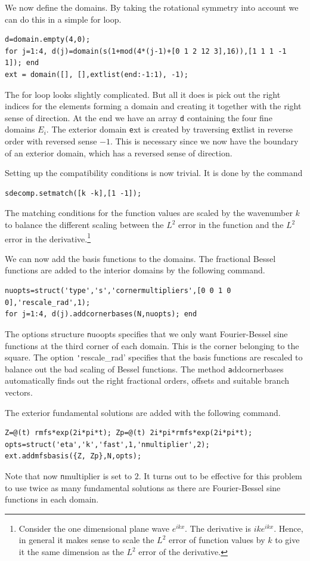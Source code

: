 We now define the domains. By taking the rotational symmetry into
account we can do this in a simple for loop.

\begin{verbatim}
d=domain.empty(4,0);
for j=1:4, d(j)=domain(s(1+mod(4*(j-1)+[0 1 2 12 3],16)),[1 1 1 -1 1]); end
ext = domain([], [],extlist(end:-1:1), -1); 
\end{verbatim}
The for loop looks slightly complicated. But all it does is pick out
the right indices for the elements forming a domain and creating it
together with the right sense of direction. At the end we have an
array {\texttt d} containing the four fine domains $E_i$. The exterior
domain {\texttt ext} is created by traversing {\texttt extlist} in
reverse order with reversed sense $-1$. This is necessary since we now
have the boundary of an exterior domain, which has a reversed sense of
direction.

Setting up the compatibility conditions is now trivial. It is done by
the command
\begin{verbatim}
sdecomp.setmatch([k -k],[1 -1]);
\end{verbatim}
The matching conditions for the function values are scaled by the
wavenumber $k$ to balance the different scaling between the $L^2$ error
in the function and the $L^2$ error in the
derivative.\footnote{Consider the one dimensional plane wave
  $e^{ikx}$. The derivative is $ike^{ikx}$. Hence, in general it makes sense to
  scale the $L^2$ error of function values by $k$ to give it the same
  dimension as the $L^2$ error of the derivative.}

We can now add the basis functions to the domains. The fractional
Bessel functions are added to the interior domains by the following
command.
\begin{verbatim}
nuopts=struct('type','s','cornermultipliers',[0 0 1 0 0],'rescale_rad',1);
for j=1:4, d(j).addcornerbases(N,nuopts); end
\end{verbatim}
The options structure {\texttt nuoopts} specifies that we only want
Fourier-Bessel sine functions at the third corner of each domain. This
is the corner belonging to the square. The option {\texttt
  'rescale\_rad'} specifies that the basis functions are rescaled to
balance out the bad scaling of Bessel functions. The method {\texttt
  addcornerbases} automatically finds out the right fractional orders,
offsets and suitable branch vectors.

The exterior fundamental solutions are added with the following command.
\begin{verbatim}
Z=@(t) rmfs*exp(2i*pi*t); Zp=@(t) 2i*pi*rmfs*exp(2i*pi*t);
opts=struct('eta','k','fast',1,'nmultiplier',2);
ext.addmfsbasis({Z, Zp},N,opts);
\end{verbatim}
Note that now {\texttt nmultiplier} is set to $2$. It turns out to be
effective for this problem to use twice as many fundamental solutions
as there are Fourier-Bessel sine functions in each domain.

